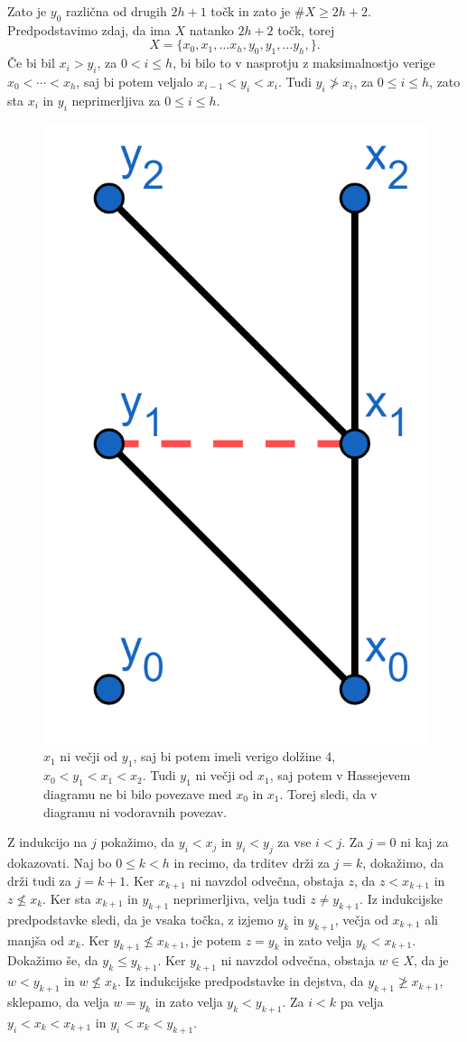 \documentclass[mat1]{fmfdelo}
\begin{document}
\begin{dokaz}
          Zato je $y_0$ različna od drugih $2h+1$ točk in zato je $\# X\geq 2h+2$.
          Predpodstavimo zdaj, da ima $X$ natanko $2h+2$ točk, torej 
          $$
          X=\{x_0,x_1,\ldots x_h,y_0,y_1,\ldots y_h,\}.
          $$
          Če bi bil $x_i > y_i$, za $0<i\leq h$, bi bilo to v nasprotju z 
          maksimalnostjo verige $x_0 <\cdots <x_h$, saj bi potem veljalo $x_{i-1} 
          < y_i < x_i$. Tudi $y_i \ngtr x_i$, za $0\leq i \leq h$, zato sta $x_i $ in $y_i$ neprimerljiva za $0\leq i \leq h$.
  

          \begin{figure}[h!]
            \centering
            \includegraphics[width=0.2\linewidth]{minsfera_vodoravna.png}
          \caption{$x_1$ ni večji od $y_1$, saj bi potem imeli verigo dolžine 4, $x_0<y_1<x_1<x_2$. Tudi $y_1$ ni večji od $x_1$, saj potem v Hassejevem diagramu ne bi bilo povezave med $x_0$ in $x_1$. Torej sledi, da v diagramu ni vodoravnih povezav.}
          \end{figure}

          Z indukcijo na $j$ pokažimo, da $y_i < x_j$ in $y_i < y_j$ za vse $i<j$. Za $j=0$ 
          ni kaj za dokazovati. Naj bo $0\leq k <h$ in recimo, da trditev drži za $j=k$, 
          dokažimo, da drži tudi za $j=k+1$. Ker $x_{k+1}$ ni navzdol odvečna, 
          obstaja $z$, da $z< x_{k+1}$ in $z\nleq x_k$. Ker sta $x_{k+1}$ in 
          $y_{k+1}$ neprimerljiva, velja tudi $z\neq y_{k+1}$. Iz indukcijske 
          predpodstavke sledi, da je vsaka točka, z izjemo $y_k$ in $y_{k+1}$, večja 
          od $x_{k+1}$ ali manjša od $x_k$. Ker $y_{k+1} \nleq x_{k+1}$, je potem
          $z=y_k$ in zato velja $y_k<x_{k+1}$. Dokažimo še, da $y_k\leq y_{k+1}$. Ker 
          $y_{k+1}$ ni navzdol odvečna, obstaja $w\in X$, da je $w<y_{k+1}$ in 
          $w\nleq x_k$. Iz indukcijske predpodstavke
           in dejstva, da $y_{k+1}\ngeq x_{k+1}$, sklepamo,
          da velja $w=y_k$ in zato velja  $y_k<y_{k+1}$. Za $i<k$ pa velja $y_i<x_k<x_{k+1}$ in
          $y_i<x_k<y_{k+1}$.



\end{dokaz}
\end{document}
